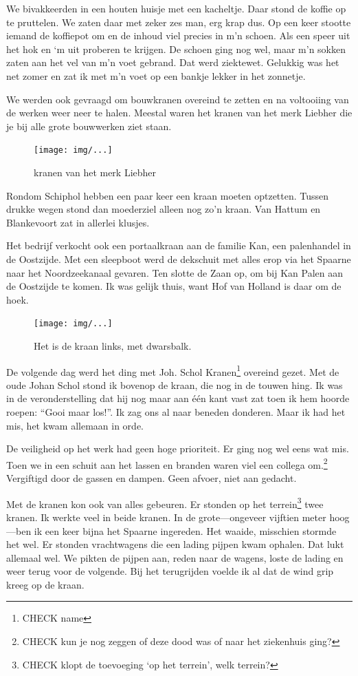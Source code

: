 \documentclass[12pt,twoside, openright]{memoir}
\begin{document}
We bivakkeerden in een houten huisje met een kacheltje. Daar stond de koffie op te pruttelen. We zaten daar met zeker zes man, erg krap dus. Op een keer stootte iemand de koffiepot om en de inhoud viel precies in m'n schoen. Als een speer uit het hok en `m uit proberen te krijgen. De schoen ging nog wel, maar m'n sokken zaten aan het vel van m'n voet gebrand. Dat werd ziektewet. Gelukkig was het net zomer en zat ik met m'n voet op een bankje lekker in het zonnetje.

We werden ook gevraagd om bouwkranen overeind te zetten en na voltooiing van de werken weer neer te halen. Meestal waren het kranen van het merk Liebher die je bij alle grote bouwwerken ziet staan. 

\begin{figure}[t]
\texttt{[image: img/...]}
\caption{kranen van het merk Liebher}
\end{figure}

Rondom Schiphol hebben een paar keer een kraan moeten optzetten. Tussen drukke wegen stond dan moederziel alleen nog zo’n kraan. Van Hattum en Blankevoort zat in allerlei klusjes.

Het bedrijf verkocht ook een portaalkraan aan de familie Kan, een palenhandel in de Oostzijde. Met een sleepboot werd de dekschuit met alles erop via het Spaarne naar het Noordzeekanaal gevaren. Ten slotte de Zaan op, om bij Kan Palen aan de Oostzijde te komen. Ik was gelijk thuis, want Hof van Holland is daar om de hoek. 

\begin{figure}[t]
\texttt{[image: img/...]}
\caption{Het is de kraan links, met dwarsbalk.}
\end{figure}

De volgende dag werd het ding met Joh. Schol Kranen\footnote{CHECK name} overeind gezet. Met de oude Johan Schol stond ik bovenop de kraan, die nog in de touwen hing. Ik was in de veronderstelling dat hij nog maar aan één kant vast zat toen ik hem hoorde roepen: ``Gooi maar los!''. Ik zag ons al naar beneden donderen. Maar ik had het mis, het kwam allemaan in orde. 

De veiligheid op het werk had geen hoge prioriteit. Er ging nog wel eens wat mis. Toen we in een schuit aan het lassen en branden waren viel een collega om.\footnote{CHECK kun je nog zeggen of deze dood was of naar het ziekenhuis ging?} Vergiftigd door de gassen en dampen. Geen afvoer, niet aan gedacht. 

Met de kranen kon ook van alles gebeuren. Er stonden op het terrein\footnote{CHECK klopt de toevoeging `op het terrein', welk terrein?} twee kranen. Ik werkte veel in beide kranen. In de grote---ongeveer vijftien meter hoog---ben ik een keer bijna het Spaarne ingereden. Het waaide, misschien stormde het wel. Er stonden vrachtwagens die een lading pijpen kwam ophalen. Dat lukt allemaal wel. We pikten de pijpen aan, reden naar de wagens, loste de lading en weer terug voor de volgende. Bij het terugrijden voelde ik al dat de wind grip kreeg op de kraan. 
\end{document}
